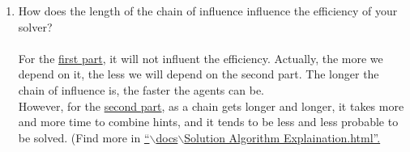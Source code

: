 \documentclass[letter]{article}
\begin{document}
\begin{enumerate}
	\item {How does the length of the chain of influence influence the efficiency of your solver?} \\
	\\
	For the \hyperref[firstpart]{first part}, it will not influent the efficiency. Actually, the more we depend on it, the less we will depend on the second part. The longer the chain of influence is, the faster the agents can be. \\
	However, for the \hyperref[secondpart]{second part}, as a chain gets longer and longer, it takes more and more time to combine hints, and it tends to be less and less probable to be solved. (Find more in \href{run:Solution Algorithm Explaination.html}{``$ \backslash $docs$ \backslash $Solution Algorithm Explaination.html''.}\\
	

\end{enumerate}
\end{document}

